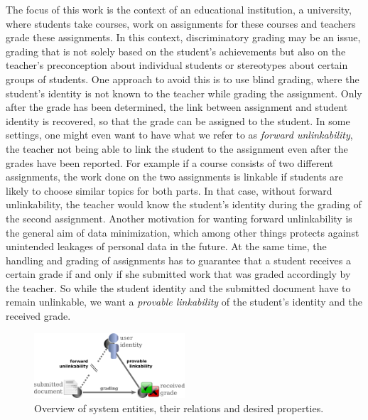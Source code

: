 The focus of this work is the context of an educational institution, \eg a
university, where students take courses, work on assignments for these
courses and teachers grade these assignments.
%
In this context, discriminatory grading may be an issue, \ie grading
that is not solely based on the student's achievements but also on the
teacher's preconception about individual students or stereotypes about 
certain groups of students.
One approach to avoid this is to use blind grading, where
the student's identity is not known to the teacher while grading the assignment.
Only after the grade has been determined, the link between assignment and student
identity is recovered, so that the grade can be assigned to the student.
%
In some settings, one might even want to have what we refer to as
\emph{forward unlinkability}, \ie the teacher not being able to link
the student to the assignment even after the grades have been reported. 
For example if a course consists of two different assignments, 
the work done on the two
assignments is linkable if students are likely to choose
similar topics for both parts. In
that case, without forward unlinkability, the teacher would know the
student's identity during the grading of the second assignment. 
Another motivation for wanting forward unlinkability is the general aim
of data minimization,
which among other things protects against unintended leakages of
personal data in the future.
%
At the same time, the handling and grading of assignments has to
guarantee that a student receives a certain grade if and only if she
submitted work that was graded accordingly by the teacher. So while the
student identity and the submitted document have to remain unlinkable,
we want a \emph{provable linkability} of the student's identity and the
received grade. 
%

\begin{figure}[htbp]
   \centering
   \includegraphics[width=0.5\textwidth]{images/document-submission-system/user-grade-document.png}
   \caption{Overview of system entities, their relations and desired properties.}
   \label{figure:document-submission-system:user-grade-document}
\end{figure}


